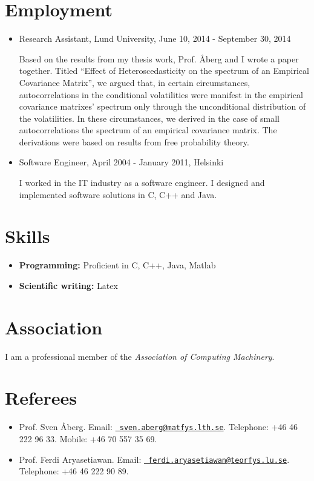 \documentclass[10pt,letterpaper]{article}
\begin{document}
\section*{Employment}
\begin{itemize}
\item Research Assistant, Lund University, June 10, 2014 - September
  30, 2014

  Based on the results from my thesis work, Prof. \AA berg and I wrote
  a paper together. Titled ``Effect of Heteroscedasticity on the
  spectrum of an Empirical Covariance Matrix'', we argued that, in
  certain circumstances, autocorrelations in the conditional
  volatilities were manifest in the empirical covariance matrixes'
  spectrum only through the unconditional distribution of the
  volatilities. In these circumstances, we derived in the case of small
  autocorrelations the spectrum of an empirical covariance matrix. The
  derivations were based on results from free probability theory.

\item Software Engineer, April 2004 - January 2011, Helsinki

I worked in the IT industry as a software engineer. I designed and
implemented software solutions in C, C++ and Java.

\end{itemize}

\section*{Skills}
\begin{itemize}
\item {\bf Programming:} Proficient in C, C++, Java, Matlab
\item {\bf Scientific writing:} Latex
\end{itemize}

\section*{Association}
I am a professional member of the {\it Association of Computing Machinery}.

\section*{Referees}
\begin{itemize}
\item Prof. Sven \AA berg. Email:
  \href{mailto:sven.aberg@matfys.lth.se}{\tt
    sven.aberg@matfys.lth.se}. Telephone: +46 46 222 96 33. Mobile:
  +46 70 557 35 69.

\item Prof. Ferdi
  Aryasetiawan. Email: \href{ferdi.aryasetiawan@teorfys.lu.se}{\tt
    ferdi.aryasetiawan@teorfys.lu.se}. Telephone: +46 46 222 90 89.
\end{itemize}
\end{document}
